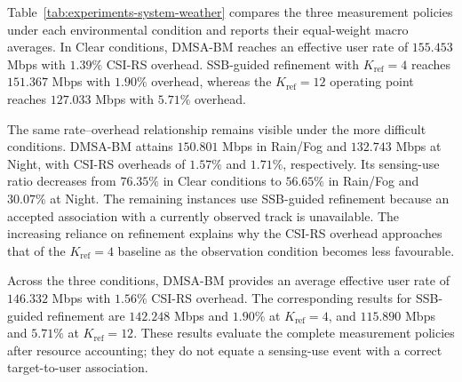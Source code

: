 Table~\ref{tab:experiments-system-weather} compares the three measurement
policies under each environmental condition and reports their equal-weight
macro averages.  In Clear conditions, DMSA-BM
reaches an effective user rate of \(155.453\) Mbps with \(1.39\%\) CSI-RS
overhead.  SSB-guided refinement with \(K_{\mathrm{ref}}=4\) reaches
\(151.367\) Mbps with \(1.90\%\) overhead, whereas the
\(K_{\mathrm{ref}}=12\) operating point reaches \(127.033\) Mbps with
\(5.71\%\) overhead.

The same rate--overhead relationship remains visible under the more difficult
conditions.  DMSA-BM attains \(150.801\) Mbps in Rain/Fog and \(132.743\) Mbps
at Night, with CSI-RS overheads of \(1.57\%\) and \(1.71\%\), respectively.
Its sensing-use ratio decreases from \(76.35\%\) in Clear conditions to
\(56.65\%\) in Rain/Fog and \(30.07\%\) at Night.  The remaining instances use
SSB-guided refinement because an accepted association with a currently observed
track is unavailable.  The increasing reliance on refinement explains why the
CSI-RS overhead approaches that of the \(K_{\mathrm{ref}}=4\) baseline as the
observation condition becomes less favourable.

Across the three conditions, DMSA-BM provides an average effective user rate of
\(146.332\) Mbps with \(1.56\%\) CSI-RS overhead.  The corresponding results for
SSB-guided refinement are \(142.248\) Mbps and \(1.90\%\) at
\(K_{\mathrm{ref}}=4\), and \(115.890\) Mbps and \(5.71\%\) at
\(K_{\mathrm{ref}}=12\).  These results evaluate the complete measurement
policies after resource accounting; they do not equate a sensing-use event with
a correct target-to-user association.

